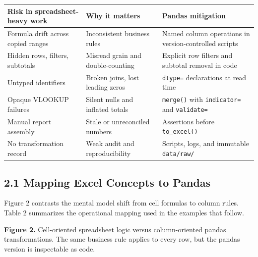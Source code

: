 \documentclass[
  12pt,
]{article}
\newcounter{none} %
\begin{document}
{\def\LTcaptype{none} %
\begin{longtable}[]{@{}
  >{\raggedright\arraybackslash}p{}
  >{\raggedright\arraybackslash}p{}
  >{\raggedright\arraybackslash}p{}@{}}
\toprule\noalign{}
\begin{minipage}[b]{\linewidth}\raggedright
Risk in spreadsheet-heavy work
\end{minipage} & \begin{minipage}[b]{\linewidth}\raggedright
Why it matters
\end{minipage} & \begin{minipage}[b]{\linewidth}\raggedright
Pandas mitigation
\end{minipage} \\
\midrule\noalign{}
\endhead
\bottomrule\noalign{}
\endlastfoot
Formula drift across copied ranges & Inconsistent business rules & Named
column operations in version-controlled scripts \\
Hidden rows, filters, subtotals & Misread grain and double-counting &
Explicit row filters and subtotal removal in code \\
Untyped identifiers & Broken joins, lost leading zeros & \texttt{dtype=}
declarations at read time \\
Opaque VLOOKUP failures & Silent nulls and inflated totals &
\texttt{merge()} with \texttt{indicator=} and \texttt{validate=} \\
Manual report assembly & Stale or unreconciled numbers & Assertions
before \texttt{to\_excel()} \\
No transformation record & Weak audit and reproducibility & Scripts,
logs, and immutable \texttt{data/raw/} \\
\end{longtable}
}

\subsection{2.1 Mapping Excel Concepts to
Pandas}\label{mapping-excel-concepts-to-pandas}

Figure 2 contrasts the mental model shift from cell formulas to column
rules. Table 2 summarizes the operational mapping used in the examples
that follow.

\textbf{Figure 2.} Cell-oriented spreadsheet logic versus
column-oriented pandas transformations. The same business rule applies
to every row, but the pandas version is inspectable as code.
\end{document}
